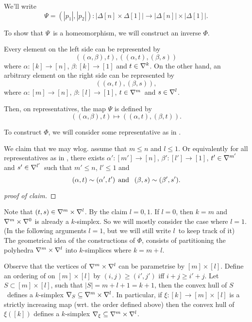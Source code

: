 \documentclass[a4paper,11pt,english]{article}
\begin{document}
\begin{exercise}[2]
We'll write 
\[ \Psi = (|p_1|, |p_2|) : |\Delta[n] \times \Delta[1]| \to |\Delta[n]|\times
|\Delta[1]|. \]

To show that $\Psi$ is a homeomorphism, we will construct an inverse $\Phi$.

Every element on the left side can be represented by
\begin{equation}
\label{eq:1}
\left((\alpha, \beta), t\right),
\left((\alpha,t), (\beta, s)\right)
\end{equation}
where $\alpha : [k] \to [n]$, $\beta: [k] \to [1]$ and $t \in \nabla^k$.
On the other hand, an arbitrary element on the right side can be represented by
\begin{equation}
\label{eq:2}
\left((\alpha,t), (\beta, s)\right),
\end{equation}
where $\alpha: [m] \to [n]$, $\beta: [l] \to [1]$, $t \in \nabla^m$ and
$s\in\nabla^l$.

Then, on representatives, the map $\Psi$ is defined by
\[ ((\alpha,\beta), t) \mapsto ((\alpha,t), (\beta,t)). \]

To construct $\Phi$, we will consider some representative as in . 

We claim that we may wlog. assume that $m \le n$ and $l \le 1$. Or equivalently 
for all representatives as in , there exists $\alpha':
[m'] \to [n]$, $\beta': [l'] \to [1]$, $t'\in \nabla^{m'}$ and $s'\in
\nabla^{l'}$ such that $m' \le n$, $l' \le 1$ and 
\[ (\alpha,t) \sim (\alpha',t') \:\:\text{and }\:\: (\beta,s) \sim (\beta',s'). \]

\begin{proof}[proof of claim]
\end{proof}

Note that $(t,s) \in \nabla^m \times \nabla^l$. By the claim $l = 0,1$. If $l = 0$, then $k=m$
and $\nabla^m \times \nabla^0$ is already a $k$-simplex. So we will mostly consider
the case where $l=1$. (In the following arguments $l=1$, but we will still write
$l$ to keep track of it)
The geometrical idea of the constructions of $\Phi$,
consists of partitioning the polyhedra $\nabla^m \times \nabla^l$ into $k$-simplices 
where $k = m + l$.

Observe that the vertices of $\nabla^m \times \nabla^l$ can be parametrise by
$[m] \times [l]$. Define an ordering of on $[m] \times [l]$ by 
$(i,j) \ge (i',j')$ iff $i+j \ge i'+j$. 
Let $S\subset [m]\times [l]$, such that $|S| = m+l+1 = k+1$, then the convex hull
of $S$ defines a $k$-simplex $\nabla_S \subseteq \nabla^m \times \nabla^l$. 
In particular, if $\xi: [k] \to [m]\times[l]$ is a strictly increasing map 
(wrt. the order defined above) then the convex hull of $\xi([k])$ defines a 
$k$-simplex $\nabla_\xi \subseteq \nabla^m \times \nabla^l$.


\end{exercise}
\end{document}
